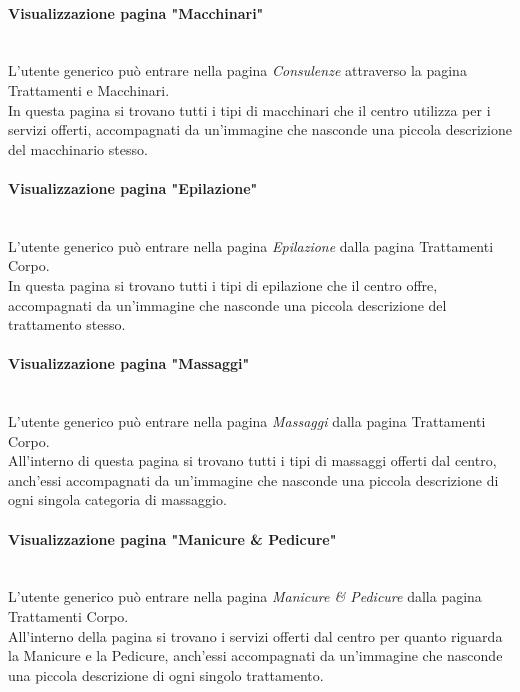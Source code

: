 \documentclass[]{article}
\begin{document}
\paragraph{Visualizzazione pagina "Macchinari"}\mbox{}\\
L'utente generico può entrare nella pagina \textit{Consulenze} attraverso la pagina Trattamenti e Macchinari.\\
In questa pagina si trovano tutti i tipi di macchinari che il centro utilizza per i servizi offerti, accompagnati da un'immagine che nasconde una piccola descrizione del macchinario stesso.\\

\paragraph{Visualizzazione pagina "Epilazione"}\mbox{}\\
L'utente generico può entrare nella pagina \textit{Epilazione} dalla pagina Trattamenti Corpo.\\
In questa pagina si trovano tutti i tipi di epilazione che il centro offre, accompagnati da un'immagine che nasconde una piccola descrizione del trattamento stesso.\\

\paragraph{Visualizzazione pagina "Massaggi"}\mbox{}\\
L'utente generico può entrare nella pagina \textit{Massaggi} dalla pagina Trattamenti Corpo.\\
All'interno di questa pagina si trovano tutti i tipi di massaggi offerti dal centro, anch'essi accompagnati da un'immagine che nasconde una piccola descrizione di ogni singola categoria di massaggio.\\

\paragraph{Visualizzazione pagina "Manicure \& Pedicure"}\mbox{}\\
L'utente generico può entrare nella pagina \textit{Manicure \& Pedicure} dalla pagina Trattamenti Corpo.\\
All'interno della pagina si trovano i servizi offerti dal centro per quanto riguarda la Manicure e la Pedicure, anch'essi accompagnati da un'immagine che nasconde una piccola descrizione di ogni singolo trattamento.\\
\end{document}
